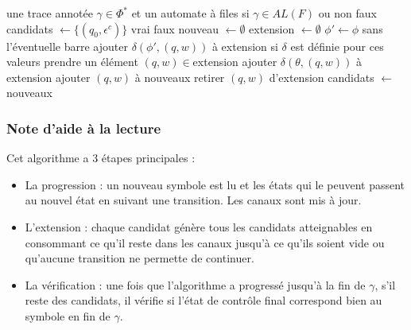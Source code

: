 \begin{algo}[Appartenance à $AL(F)$]\label{alg:membership}
  \begin{algorithmic}[1]
    \REQUIRE une trace annotée $\gamma\in\Phi^*$ et un automate à files \fifo
    \ENSURE si $\gamma\in AL(F)$ ou non
      \RETURN faux
    \ENDIF
    \STATE candidats $\leftarrow\{(q_0,\epsilon^c)\}$
        \STATE {}
            \RETURN vrai
          \ENDIF
        \ENDFOR
        \RETURN faux
      \ELSE
        \STATE {}
        \STATE nouveau $\leftarrow\emptyset$
        \STATE extension $\leftarrow\emptyset$
          \STATE $\phi'\leftarrow\phi$ sans l'éventuelle barre
          \STATE {}
          \STATE ajouter $\delta(\phi', (q,w))$ à extension si $\delta$ est définie pour ces valeurs
        \ENDFOR
        \STATE {}
          \STATE {}
          \STATE prendre un élément $(q,w)\in$extension
              \STATE {}
              \STATE ajouter $\delta(\theta, (q,w))$ à extension
            \ENDIF
          \ENDFOR
          \STATE ajouter $(q,w)$ à nouveaux
          \STATE retirer $(q,w)$ d'extension
        \ENDWHILE
        \STATE candidats $\leftarrow$ nouveaux
      \ENDIF
    \ENDFOR
  \end{algorithmic}
\end{algo}


\subsubsection*{Note d'aide à la lecture}

Cet algorithme a 3 étapes principales :
\begin{itemize}
  \item La progression : un nouveau symbole est lu et les états qui le peuvent passent au nouvel état en suivant une transition. Les canaux sont mis à jour.
  \item L'extension : chaque candidat génère tous les candidats atteignables en consommant ce qu'il reste dans les canaux jusqu'à ce qu'ils soient vide ou qu'aucune transition ne permette de continuer.
  \item La vérification : une fois que l'algorithme a progressé jusqu'à la fin de $\gamma$, s'il reste des candidats, il vérifie si l'état de contrôle final correspond bien au symbole en fin de $\gamma$.
\end{itemize}

